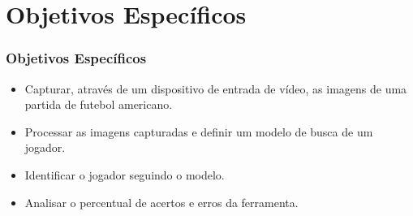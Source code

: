 \section{Objetivos Específicos}
\begin{frame}
\frametitle{Objetivos Específicos}

\begin{block}{}
\begin{itemize}
\item Capturar, através de um dispositivo de entrada de vídeo, as imagens de uma partida de futebol americano.

\item Processar as imagens capturadas e definir um modelo de busca de um jogador.
   
\item Identificar o jogador seguindo o modelo.
   
\item Analisar o percentual de acertos e erros da ferramenta.

\end{itemize}
\end{block}
\end{frame}
